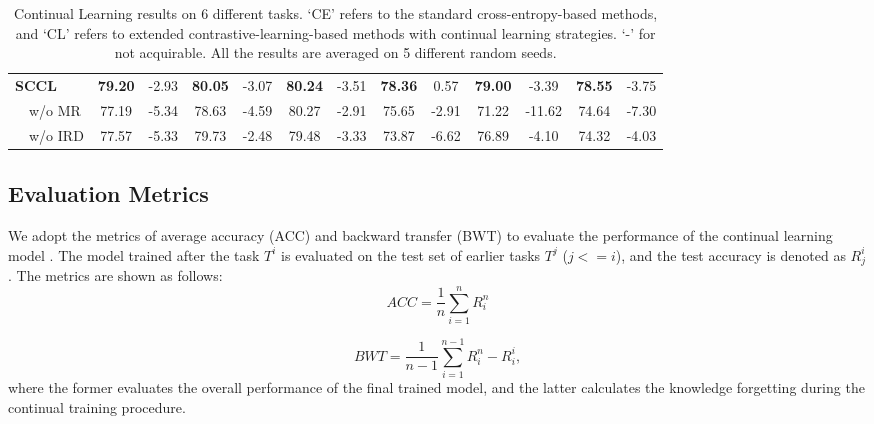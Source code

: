 \begin{table}[]
\begin{tabular}{l|cc|cc|cc|cc|cc|cc}
\textbf{SCCL} & \textbf{79.20} & -2.93 & \textbf{80.05}  & -3.07    &  \textbf{80.24}  &  -3.51  &  \textbf{78.36}   &  0.57   & \textbf{79.00}   & -3.39  & \textbf{78.55}  & -3.75  \\
\ \ {{w/o MR}} & 77.19 & -5.34  & 78.63  &  -4.59   &  80.27  &  -2.91   &  75.65   & -2.91     &  71.22  &  -11.62  &  74.64   & -7.30             \\
\ \ {{w/o IRD}} & 77.57 & -5.33 & 79.73  & -2.48    &  79.48  &  -3.33  &  73.87   &  -6.62   & 76.89   & -4.10  & 74.32  & -4.03   \\
\hline
\end{tabular}
\caption{Continual Learning results on 6 different tasks.  `CE' refers to the standard cross-entropy-based methods, and `CL' refers to extended  contrastive-learning-based methods with continual learning strategies. `-' for not acquirable. All the results are averaged on 5 different random seeds. }
\label{results}
    \vspace{-5mm}
\end{table}

\subsection{Evaluation Metrics}
We adopt the metrics of average accuracy (ACC) and backward transfer (BWT) to evaluate the performance of the continual learning model \cite{lopez2017gradient}. The model trained after the task $T^i$ is evaluated on the test set of earlier tasks $T^j$ ($j<=i$), and the test accuracy is denoted as $R^i_j$. The metrics are shown as follows:
\begin{equation}
    ACC = \frac{1}{n} \sum_{i=1}^{n} R^n_i
\end{equation}

\begin{equation}
    BWT = \frac{1}{n-1} \sum_{i=1}^{n-1} R^n_i - R^i_i,
\end{equation}
where the former evaluates the overall performance of the final trained model, and the latter calculates the knowledge forgetting during the continual training procedure.


